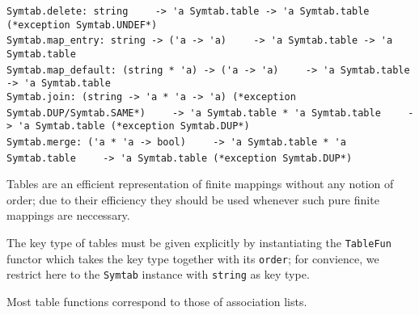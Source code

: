 \begin{isabellebody}
\begin{isamarkuptext}
\begin{mldecls}
  \verb|Symtab.delete: string|\isasep\isanewline%
\verb|    -> 'a Symtab.table -> 'a Symtab.table (*exception Symtab.UNDEF*)| \\
  \verb|Symtab.map_entry: string -> ('a -> 'a)|\isasep\isanewline%
\verb|    -> 'a Symtab.table -> 'a Symtab.table| \\
  \verb|Symtab.map_default: (string * 'a) -> ('a -> 'a)|\isasep\isanewline%
\verb|    -> 'a Symtab.table -> 'a Symtab.table| \\
  \verb|Symtab.join: (string -> 'a * 'a -> 'a) (*exception Symtab.DUP/Symtab.SAME*)|\isasep\isanewline%
\verb|    -> 'a Symtab.table * 'a Symtab.table|\isasep\isanewline%
\verb|    -> 'a Symtab.table (*exception Symtab.DUP*)| \\
  \verb|Symtab.merge: ('a * 'a -> bool)|\isasep\isanewline%
\verb|    -> 'a Symtab.table * 'a Symtab.table|\isasep\isanewline%
\verb|    -> 'a Symtab.table (*exception Symtab.DUP*)|
  \end{mldecls}%
\end{isamarkuptext}%
\isamarkuptrue%
%
\begin{isamarkuptext}%
Tables are an efficient representation of finite mappings without
  any notion of order;  due to their efficiency they should be used
  whenever such pure finite mappings are neccessary.

  The key type of tables must be given explicitly by instantiating
  the \verb|TableFun| functor which takes the key type
  together with its \verb|order|; for convience, we restrict
  here to the \verb|Symtab| instance with \verb|string|
  as key type.

  Most table functions correspond to those of association lists.%
\end{isamarkuptext}%
\isamarkuptrue%
%
\isadelimtheory
%
\endisadelimtheory
%
\isatagtheory
{}\isamarkupfalse%
%
\endisatagtheory
{\isafoldtheory}%
%
\isadelimtheory
%
\endisadelimtheory
\isanewline
\end{isabellebody}%
